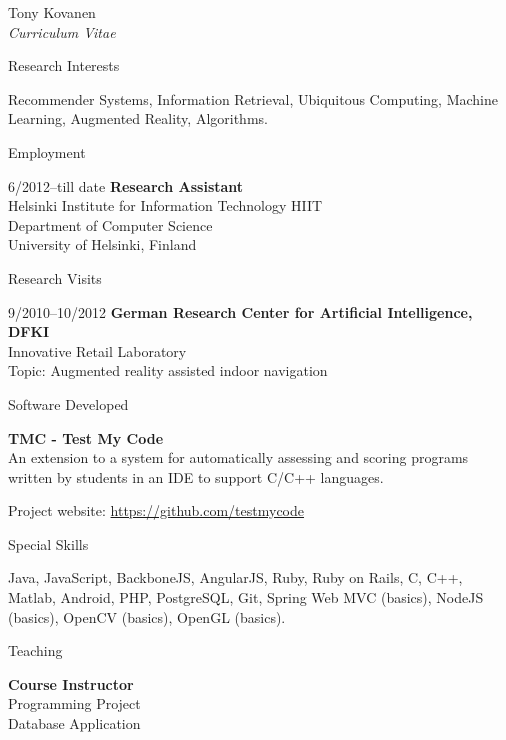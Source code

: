 \documentclass[10pt]{article}
\begin{document}
\begin{cv}{Tony Kovanen\\{\large \itshape Curriculum Vitae}}
\begin{cvlist}{Research Interests}
	\item Recommender Systems, Information Retrieval, Ubiquitous Computing, Machine Learning, Augmented Reality, Algorithms.
\end{cvlist}

\newpage
\begin{cvlist}{Employment}
	\item[6/2012--till date] {\bf Research Assistant}\\
	Helsinki Institute for Information Technology HIIT\\
	Department of Computer Science\\
	University of Helsinki, Finland

\end{cvlist}

\begin{cvlist}{Research Visits}
	\item[9/2010--10/2012] {\bf German Research Center for Artificial Intelligence, DFKI}\\		
		Innovative Retail Laboratory\\	
		Topic: Augmented reality assisted indoor navigation
\end{cvlist}

\begin{cvlist}{Software Developed}
	\item \textbf{TMC - Test My Code}\\
    An extension to a system for automatically assessing and scoring programs written by students in an IDE to support C/C++ languages. 
	\item Project website: \url{https://github.com/testmycode}	
\end{cvlist}

\begin{cvlist}{Special Skills}
\item Java, JavaScript, BackboneJS, AngularJS, Ruby, Ruby on Rails, C, C++, Matlab, Android, PHP, PostgreSQL, Git, Spring Web MVC (basics), NodeJS (basics), OpenCV (basics), OpenGL (basics). 
\end{cvlist}

\begin{cvlist}{Teaching}
	\item {\bf Course Instructor}\\
	Programming Project\\
    Database Application\\
		

\end{cvlist}
\end{cv}
\end{document}
